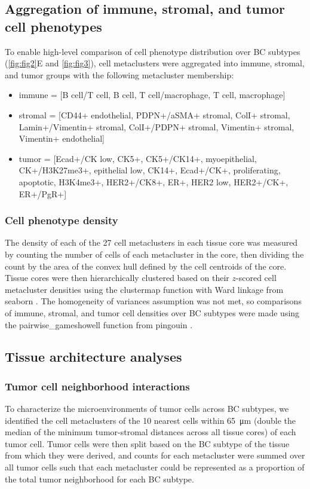 \documentclass[preprint,review,3p,12pt]{elsarticle}
\begin{document}
\subsection{Aggregation of immune, stromal, and tumor cell phenotypes}
To enable high-level comparison of cell phenotype distribution over BC subtypes (\autoref{fig:fig2}E and \autoref{fig:fig3}), cell metaclusters were aggregated into immune, stromal, and tumor groups with the following metacluster membership:
\begin{itemize}
    \item immune = [B cell/T cell, B cell, T cell/macrophage, T cell, macrophage]
    \item stromal = [CD44+ endothelial, PDPN+/aSMA+ stromal, ColI+ stromal, Lamin+/Vimentin+ stromal, ColI+/PDPN+ stromal, Vimentin+ stromal, Vimentin+ endothelial]
    \item tumor = [Ecad+/CK low, CK5+, CK5+/CK14+, myoepithelial, CK+/H3K27me3+, epithelial low, CK14+, Ecad+/CK+, proliferating, apoptotic, H3K4me3+, HER2+/CK8+, ER+, HER2 low, HER2+/CK+, ER+/PgR+]
\end{itemize}

\subsubsection{Cell phenotype density}
The density of each of the 27 cell metaclusters in each tissue core was measured by counting the number of cells of each metacluster in the core, then dividing the count by the area of the convex hull defined by the cell centroids of the core. Tissue cores were then hierarchically clustered based on their $z$-scored cell metacluster densities using the clustermap function with Ward linkage from seaborn \cite{seaborn2020}. The homogeneity of variances assumption was not met, so comparisons of immune, stromal, and tumor cell densities over BC subtypes were made using the pairwise\_gameshowell function from pingouin \cite{pingouin2018}.

\subsection{Tissue architecture analyses}
\subsubsection{Tumor cell neighborhood interactions}
To characterize the microenvironments of tumor cells across BC subtypes, we identified the cell metaclusters of the 10 nearest cells within \SI{65}{\micro\meter} (double the median of the minimum tumor-stromal distances across all tissue cores) of each tumor cell. Tumor cells were then split based on the BC subtype of the tissue from which they were derived, and counts for each metacluster were summed over all tumor cells such that each metacluster could be represented as a proportion of the total tumor neighborhood for each BC subtype. 
\end{document}
